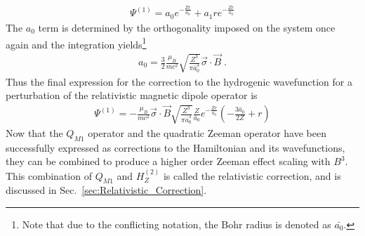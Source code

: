             \begin{align}
                \varPsi^{(1)} = a_0 e^{-\frac{Zr}{a_0}} + a_1 re^{-\frac{Zr}{a_0}}
            \end{align}
            \noindent The $a_0$ term is determined by the orthogonality imposed on the system once again and the integration yields\footnote{Note that due to the conflicting notation, the Bohr radius is denoted as $\bar{a_0}$.}
            \begin{align}
                a_0 = \frac{3}{2}\frac{\mu_B}{mc^2} \sqrt{\frac{Z^3}{\pi \bar{a}_0^3}} \vec{\sigma} \cdot \vec{B} \;.
            \end{align}
            \noindent Thus the final expression for the correction to the hydrogenic wavefunction for a perturbation of the relativistic magnetic dipole operator is 
            \begin{align}
                \varPsi^{(1)} = - \frac{\mu_B}{mc^2} \vec{\sigma} \cdot \vec{B} \sqrt{\frac{Z^3}{\pi \bar{a}_0^3}} \frac{Z}{\bar{a}_0} e^{-\frac{Zr}{a_0}} \left( - \frac{3\bar{a}_0}{2Z} + r \right)
            \end{align}
            \noindent Now that the $Q_{M1}$ operator and the quadratic Zeeman operator have been successfully expressed as corrections to the Hamiltonian and its wavefunctions, they can be combined to produce a higher order Zeeman effect scaling with $B^3$. This combination of $Q_{M1}$ and $H_Z^{(2)}$ is called the relativistic correction, and is discussed in Sec.~\ref{sec:Relativistic_Correction}.

